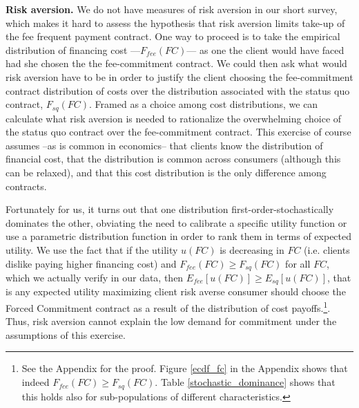 \documentclass[oneside,11pt]{article}
\begin{document}
\vspace{.1in}
\noindent \textbf{Risk aversion.} We do not have measures of risk aversion in our short survey, which makes it hard to assess the hypothesis that risk aversion limits take-up of the fee frequent payment contract. One way to proceed is to take the empirical distribution of financing cost ---$F_{fee}(FC)$--- as one the client would have faced had she chosen the the fee-commitment contract. We could then ask what would risk aversion have to be in order to justify the client choosing the fee-commitment contract distribution of costs over the distribution associated with the status quo contract, $F_{sq}(FC)$. Framed as a choice among cost distributions, we can calculate what risk aversion is needed to rationalize the overwhelming choice of the status quo contract over the fee-commitment contract. This exercise of course assumes --as is common in economics-- that clients know the distribution of financial cost, that the distribution is common across consumers (although this can be relaxed), and that this cost distribution is the only difference among contracts. 

Fortunately for us, it turns out that one distribution first-order-stochastically dominates the other, obviating the need to calibrate a specific utility function or use a parametric distribution function in order to rank them in terms of expected utility. We use the fact that if the utility $u(FC)$ is decreasing in $FC$ (i.e. clients dislike paying higher financing cost) and $F_{fee}(FC) \geq F_{sq}(FC)$ for all $FC$, which we actually verify in our data, then $E_{fee}[u(FC)] \geq E_{sq}[u(FC)]$, that is any expected utility maximizing client risk averse consumer should choose the Forced Commitment contract as a result of the distribution of cost payoffs.\footnote{See the Appendix for the proof. Figure \ref{ecdf_fc} in the Appendix shows that indeed $F_{fee}(FC) \geq F_{sq}(FC)$. Table \ref{stochastic_dominance} shows that this holds also for sub-populations of different characteristics.}. Thus, risk aversion cannot explain the low demand for commitment under the assumptions of this exercise.   

\end{document}
